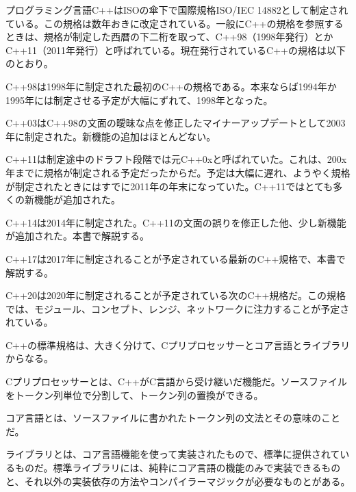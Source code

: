 %
\cleardoublepage
{}

%

プログラミング言語C++はISOの傘下で国際規格ISO/IEC
14882として制定されている。この規格は数年おきに改定されている。一般にC++の規格を参照するときは、規格が制定した西暦の下二桁を取って、C++98（1998年発行）とかC++11（2011年発行）と呼ばれている。現在発行されているC++の規格は以下のとおり。

%

C++98は1998年に制定された最初のC++の規格である。本来ならば1994年か1995年には制定させる予定が大幅にずれて、1998年となった。

%

C++03はC++98の文面の曖昧な点を修正したマイナーアップデートとして2003年に制定された。新機能の追加はほとんどない。

%

C++11は制定途中のドラフト段階では元C++0xと呼ばれていた。これは、200x年までに規格が制定される予定だったからだ。予定は大幅に遅れ、ようやく規格が制定されたときにはすでに2011年の年末になっていた。C++11ではとても多くの新機能が追加された。

%

C++14は2014年に制定された。C++11の文面の誤りを修正した他、少し新機能が追加された。本書で解説する。

%

C++17は2017年に制定されることが予定されている最新のC++規格で、本書で解説する。

%

%

C++20は2020年に制定されることが予定されている次のC++規格だ。この規格では、モジュール、コンセプト、レンジ、ネットワークに注力することが予定されている。

%

C++の標準規格は、大きく分けて、Cプリプロセッサーとコア言語とライブラリからなる。

Cプリプロセッサーとは、C++がC言語から受け継いだ機能だ。ソースファイルをトークン列単位で分割して、トークン列の置換ができる。

コア言語とは、ソースファイルに書かれたトークン列の文法とその意味のことだ。

ライブラリとは、コア言語機能を使って実装されたもので、標準に提供されているものだ。標準ライブラリには、純粋にコア言語の機能のみで実装できるものと、それ以外の実装依存の方法やコンパイラーマジックが必要なものとがある。
